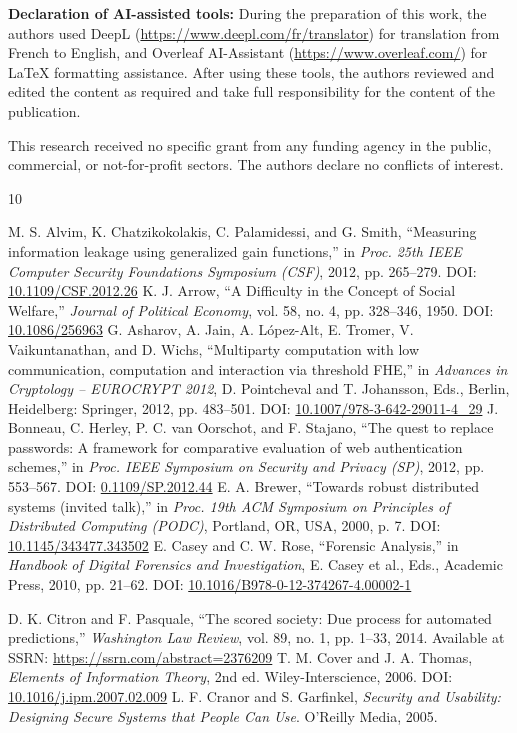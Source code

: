 \documentclass{ieeeaccess}
\begin{document}
\textbf{Declaration of AI-assisted tools:} During the preparation of this work, the authors used DeepL (\url{https://www.deepl.com/fr/translator}) for translation from French to English, and Overleaf AI-Assistant 
(\url{https://www.overleaf.com/}) for LaTeX formatting assistance. After using these tools, the authors reviewed and edited the content as required and take full responsibility for the content of the publication.

This research received no specific grant from any funding agency in the public, commercial, or not-for-profit sectors.
The authors declare no conflicts of interest.

\begin{thebibliography}{10}

M. S. Alvim, K. Chatzikokolakis, C. Palamidessi, and G. Smith, 
``Measuring information leakage using generalized gain functions,'' 
in \emph{Proc. 25th IEEE Computer Security Foundations Symposium (CSF)}, 
2012, pp. 265--279.
DOI: \url{10.1109/CSF.2012.26}
K. J. Arrow, 
``A Difficulty in the Concept of Social Welfare,'' 
\emph{Journal of Political Economy}, vol. 58, no. 4, pp. 328--346, 1950.
DOI: \url{10.1086/256963}
G. Asharov, A. Jain, A. López-Alt, E. Tromer, V. Vaikuntanathan, and D. Wichs, 
``Multiparty computation with low communication, computation and interaction via threshold FHE,'' 
in \emph{Advances in Cryptology -- EUROCRYPT 2012}, 
D. Pointcheval and T. Johansson, Eds., Berlin, Heidelberg: Springer, 2012, pp. 483--501.
DOI: \url{10.1007/978-3-642-29011-4_29}
J. Bonneau, C. Herley, P. C. van Oorschot, and F. Stajano, 
``The quest to replace passwords: A framework for comparative evaluation of web authentication schemes,'' 
in \emph{Proc. IEEE Symposium on Security and Privacy (SP)}, 
2012, pp. 553--567.
DOI: \url{0.1109/SP.2012.44}
E. A. Brewer, 
``Towards robust distributed systems (invited talk),'' 
in \emph{Proc. 19th ACM Symposium on Principles of Distributed Computing (PODC)}, 
Portland, OR, USA, 2000, p. 7.
DOI: \url{10.1145/343477.343502}
E. Casey and C. W. Rose,
``Forensic Analysis,''
in \emph{Handbook of Digital Forensics and Investigation},
E. Casey et al., Eds., Academic Press, 2010, pp. 21--62.
DOI: \url{10.1016/B978-0-12-374267-4.00002-1}

D. K. Citron and F. Pasquale, 
``The scored society: Due process for automated predictions,'' 
\emph{Washington Law Review}, vol. 89, no. 1, pp. 1--33, 2014.
Available at SSRN: \url{https://ssrn.com/abstract=2376209}
T. M. Cover and J. A. Thomas, 
\emph{Elements of Information Theory}, 2nd ed. 
Wiley-Interscience, 2006.
DOI: \url{10.1016/j.ipm.2007.02.009}
L. F. Cranor and S. Garfinkel, 
\emph{Security and Usability: Designing Secure Systems that People Can Use}. 
O'Reilly Media, 2005.


\end{thebibliography}
\end{document}
